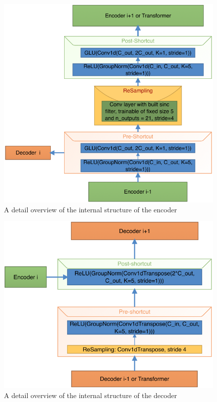 \documentclass[final]{cvpr}
\begin{document}
\begin{figure}
   \includegraphics[scale=0.3]{encoder.png}
   \caption{A detail overview of the internal structure of the encoder}
   \label{encoder}
\end{figure}

\begin{figure}
   \includegraphics[scale=0.3]{decoder.png}
   \caption{A detail overview of the internal structure of the decoder}
   \label{decoder}
\end{figure}
\end{document}
